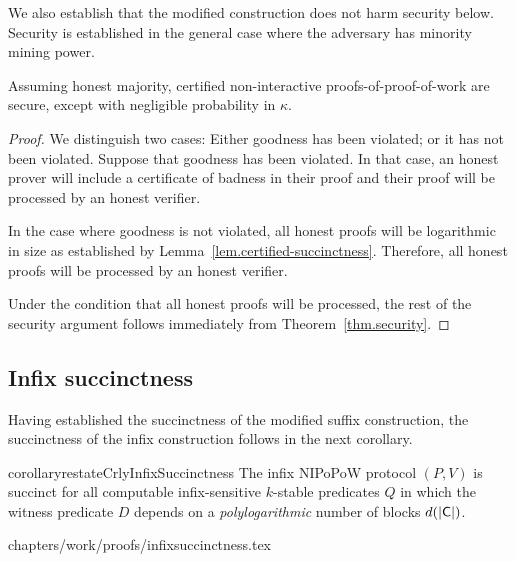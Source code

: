 We also establish that the modified construction does not harm security below.
Security is established in the general case where the adversary has minority
mining power.

\begin{theorem}
    Assuming honest majority, certified non-interactive proofs-of-proof-of-work
    are secure, except with negligible probability in $\kappa$.
\end{theorem}
\begin{proof}
    We distinguish two cases: Either goodness has been violated; or it has not
    been violated. Suppose that goodness has been violated. In that case, an
    honest prover will include a certificate of badness in their proof and their
    proof will be processed by an honest verifier.

    In the case where goodness is not violated, all honest proofs will be
    logarithmic in size as established by
    Lemma~\ref{lem.certified-succinctness}. Therefore, all honest proofs will
    be processed by an honest verifier.

    Under the condition that all honest proofs will be processed, the rest of
    the security argument follows immediately from Theorem~\ref{thm.security}.
\end{proof}


\subsection{Infix succinctness}
Having established the succinctness of the modified suffix construction, the
succinctness of the infix construction follows in the next corollary.

\begin{restatable}{corollary}{restateCrlyInfixSuccinctness}
\label{thm.infix-succinctness}
The infix NIPoPoW protocol $(P, V)$ is succinct for all computable
infix-sensitive $k$-stable predicates $Q$ in which the witness predicate $D$
depends on a \emph{polylogarithmic} number of blocks $d(|\mathsf{C}|)$.
\end{restatable}
{chapters/work/proofs/infixsuccinctness.tex}
